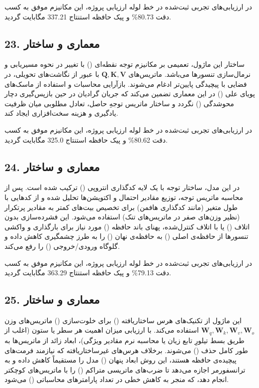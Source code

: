 \documentclass[12pt,a4paper]{report}
\theoremstyle{definition}
\begin{document}
در ارزیابی‌های تجربی ثبت‌شده در خط لوله ارزیابی پروژه، این مکانیزم موفق به کسب دقت 80.73\% و پیک حافظه استنتاج 337.21 مگابایت گردید.

\subsection*{23. معماری و ساختار }
ساختار این ماژول، تعمیمی بر مکانیزم توجه نقطه‌ای () با تغییر در نحوه مسیریابی و نرمال‌سازی تنسورها می‌باشد. ماتریس‌های $\mathbf{Q, K, V}$ با عبور از نگاشت‌های تحویلی، در فضایی با پیچیدگی پایین‌تر ادغام می‌شوند. بازآرایی محاسبات و استفاده از ماسک‌های پویای علی () در این معماری تضمین می‌کند که جریان گرادیان در حین بازپس‌گیری دچار محوشدگی () نگردد و ساختار ماتریس توجهِ حاصل، تعادل مطلوبی میان ظرفیت یادگیری و هزینه سخت‌افزاری ایجاد کند.

در ارزیابی‌های تجربی ثبت‌شده در خط لوله ارزیابی پروژه، این مکانیزم موفق به کسب دقت 80.62\% و پیک حافظه استنتاج 325.0 مگابایت گردید.

\subsection*{24. معماری و ساختار }
در این مدل، ساختار توجه با یک لایه کدگذاری انتروپی () ترکیب شده است. پس از محاسبه ماتریس توجه، توزیع مقادیر احتمال و اکتویشن‌ها تحلیل شده و از کدهایی با طول متغیر (مانند کدگذاری هافمن) برای تخصیص بیت‌های کمتر به مقادیر پرتکرار (نظیر وزن‌های صفر در ماتریس‌های تنک) استفاده می‌شود. این فشرده‌سازی بدون اتلاف () یا با اتلاف کنترل‌شده، پهنای باند حافظه () مورد نیاز برای بارگذاری و واکشی تنسورها از حافظه‌ی اصلی () به حافظه‌ی نهان () را به طرز چشمگیری کاهش داده و گلوگاه ورودی/خروجی () را رفع می‌کند.

در ارزیابی‌های تجربی ثبت‌شده در خط لوله ارزیابی پروژه، این مکانیزم موفق به کسب دقت 79.13\% و پیک حافظه استنتاج 363.29 مگابایت گردید.

\subsection*{25. معماری و ساختار }
این ماژول از تکنیک‌های هرس ساختاریافته () برای خلوت‌سازی () ماتریس‌های وزن $\mathbf{W}_q, \mathbf{W}_k, \mathbf{W}_v, \mathbf{W}_o$ استفاده می‌کند. با ارزیابی میزان اهمیت هر سطر یا ستون (اغلب از طریق بسط تیلورِ تابع زیان یا محاسبه نرم مقادیر ویژگی)، ابعاد زائد از ماتریس‌ها به طور کامل حذف () می‌شوند. برخلاف هرس‌های غیرساختاریافته که نیازمند فرمت‌های پیچیده‌ی حافظه هستند، این روش ابعاد پنهان () مدل را مستقیماً کاهش داده و به ترانسفورمر اجازه می‌دهد تا ضرب‌های ماتریسی متراکم () را با ماتریس‌های کوچکتر انجام دهد، که منجر به کاهش خطی در تعداد پارامترهای محاسباتی () می‌شود.
\end{document}
